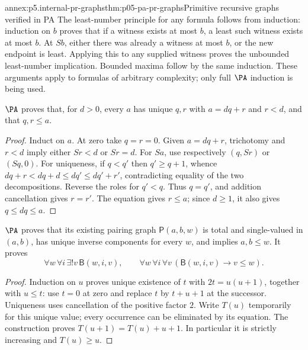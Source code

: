 \begin{annexitem}{annex:p5.internal-pr-graphs}{thm:p05-pa-pr-graphs}{Primitive recursive graphs verified in PA}
The least-number principle for any formula follows from induction: induction
on \(b\) proves that if a witness exists at most \(b\), a least such witness
exists at most \(b\).  At \(Sb\), either there was already a witness at
most \(b\), or the new endpoint is least.  Applying this to any supplied
witness proves the unbounded least-number implication.  Bounded maxima follow
by the same induction.  These arguments apply to formulas of arbitrary
complexity; only full \(\PA\) induction is being used.

\begin{annexlemma}
\label{thm:p05-pa-division}
\(\PA\) proves that, for \(d>0\), every \(a\) has unique \(q,r\) with
\(a=dq+r\) and \(r<d\), and that \(q,r\leq a\).
\end{annexlemma}
\begin{proof}
Induct on \(a\).  At zero take \(q=r=0\).  Given \(a=dq+r\),
trichotomy and \(r<d\) imply either \(Sr<d\) or \(Sr=d\).
For \(Sa\), use respectively \((q,Sr)\) or \((Sq,0)\).
For uniqueness, if \(q<q'\) then \(q'\geq q+1\), whence
\(dq+r<dq+d\leq dq'\leq dq'+r'\), contradicting equality of the
two decompositions.  Reverse the roles for \(q'<q\).  Thus \(q=q'\),
and addition cancellation gives \(r=r'\).  The equation gives \(r\leq a\);
since \(d\geq1\), it also gives \(q\leq dq\leq a\).
\end{proof}

\begin{annexlemma}
\label{thm:p05-pa-pair-beta}
\(\PA\) proves that its existing pairing graph \(\mathsf P(a,b,w)\)
is total and single-valued in \((a,b)\), has unique inverse components
for every \(w\), and implies \(a,b\leq w\).  It proves
\[
 \forall w\,\forall i\,\exists!v\,\mathsf B(w,i,v),
 \qquad
 \forall w\,\forall i\,\forall v\,
       (\mathsf B(w,i,v)\to v\leq w).
\]
\end{annexlemma}
\begin{proof}
Induction on \(u\) proves unique existence of \(t\) with
\(2t=u(u+1)\), together with \(u\leq t\): use \(t=0\) at zero
and replace \(t\) by \(t+u+1\) at the successor.  Uniqueness uses
cancellation of the positive factor \(2\).  Write \(T(u)\) temporarily
for this unique value; every occurrence can be eliminated by its equation.
The construction proves \(T(u+1)=T(u)+u+1\).  In particular it is strictly
increasing and \(T(u)\geq u\).


\end{proof}
\end{annexitem}
